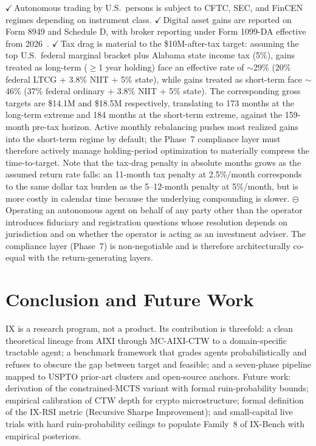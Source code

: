 \documentclass[conference,10pt,letterpaper]{IEEEtran}
\newcommand{\EV}{\textcolor{black}{\ensuremath{\checkmark}}\,}        %
\newcommand{\EP}{\textcolor{black}{\ensuremath{\circleddash}}\,}     %
\begin{document}
\EV{}Autonomous trading by U.S.\ persons is subject to CFTC, SEC, and
FinCEN regimes depending on instrument class. \EV{}Digital asset gains
are reported on Form 8949 and Schedule D, with broker reporting under
Form 1099-DA effective from 2026~\cite{irs2024digital}. \EV{}Tax drag
is material to the \$10M-after-tax target: assuming the top U.S.\
federal marginal bracket plus Alabama state income tax (5\%), gains
treated as long-term ($\geq$1 year holding) face an effective rate of
$\sim$29\% (20\% federal LTCG + 3.8\% NIIT + 5\% state), while gains
treated as short-term face $\sim$46\% (37\% federal ordinary + 3.8\%
NIIT + 5\% state). The corresponding gross targets are \$14.1M and
\$18.5M respectively, translating to 173 months at the long-term
extreme and 184 months at the short-term extreme, against the
159-month pre-tax horizon. Active monthly rebalancing pushes most
realized gains into the short-term regime by default; the Phase~7
compliance layer must therefore actively manage holding-period
optimization to materially compress the time-to-target. Note that the
tax-drag penalty in absolute months grows as the assumed return rate
falls: an 11-month tax penalty at 2.5\%/month corresponds to the same
dollar tax burden as the 5--12-month penalty at 5\%/month, but is more
costly in calendar time because the underlying compounding is slower. \EP{}Operating an autonomous
agent on behalf of any party other than the operator introduces
fiduciary and registration questions whose resolution depends on
jurisdiction and on whether the operator is acting as an investment
adviser. The compliance layer (Phase~7) is non-negotiable and is
therefore architecturally co-equal with the return-generating layers.

\section{Conclusion and Future Work}

IX is a research program, not a product. Its contribution is threefold: a
clean theoretical lineage from AIXI through MC-AIXI-CTW to a domain-specific
tractable agent; a benchmark framework that grades agents probabilistically
and refuses to obscure the gap between target and feasible; and a
seven-phase pipeline mapped to USPTO prior-art clusters and open-source
anchors. Future work: derivation of the constrained-MCTS variant with
formal ruin-probability bounds; empirical calibration of CTW depth for
crypto microstructure; formal definition of the IX-RSI metric (Recursive
Sharpe Improvement); and small-capital live trials with hard ruin-probability
ceilings to populate Family~8 of IX-Bench with empirical posteriors.



\end{document}
